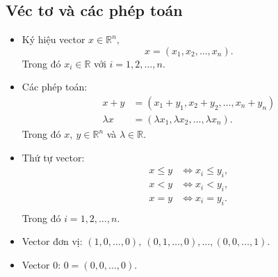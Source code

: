 \documentclass[12pt,a4paper]{report}
\begin{document}
\subsection{ Véc tơ và các phép toán }
\begin{itemize}
\item Ký hiệu vector $x \in \mathbb{R}^n,$
\begin{equation*}
x=(x_1,x_2,\ldots,x_n).
\end{equation*}
Trong đó $x_i \in \mathbb{R}$ với $i=1,2,\ldots,n$.
\item Các phép toán:
\begin{equation*}
\begin{split}
x + y &= (x_1 + y_1, x_2 + y_2 , \ldots , x_n +y_n) \\
\lambda x &= (\lambda x_1 , \lambda x_2 , \ldots , \lambda x_n).
\end{split}
\end{equation*}
Trong đó $x, \: y \in \mathbb{R}^n$ và $\lambda \in \mathbb{R}$.
\item Thứ tự vector: 
\begin{equation*}
\begin{split}
x \leq y & \Leftrightarrow x_i \leq y_i, \\
x < y & \Leftrightarrow x_i < y_i, \\
x = y & \Leftrightarrow x_i = y_i. \\
\end{split}
\end{equation*}
Trong đó $i=1,2,\ldots,n$.
\item Vector đơn vị: $(1,0,\ldots,0),\:(0,1,\ldots,0) , \ldots , (0,0,\ldots,1)$.
\item Vector $0$: $0=(0,0,\ldots,0)$. 
\end{itemize}
\end{document}
